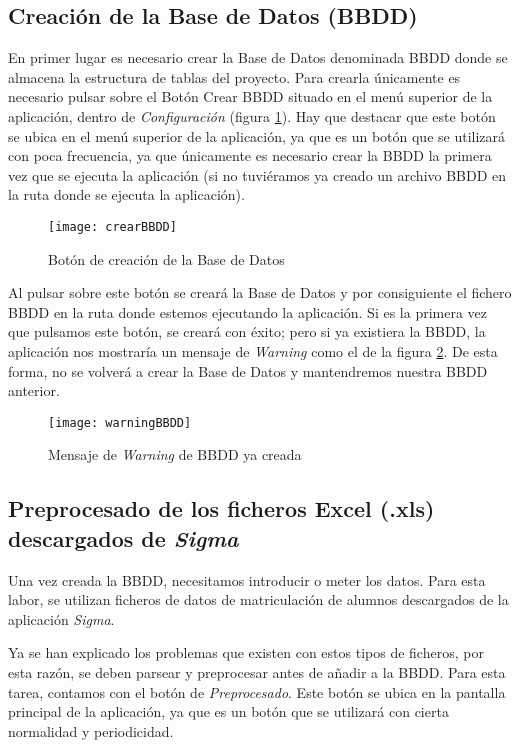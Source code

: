 \subsection{Creación de la Base de Datos (BBDD)}

En primer lugar es necesario crear la Base de Datos denominada BBDD donde se almacena la estructura de tablas del proyecto.
Para crearla únicamente es necesario pulsar sobre el Botón {Crear BBDD} situado en el menú superior de la aplicación, dentro de \emph{Configuración} (figura \ref{fig:crearBBDD}). Hay que destacar que este botón se ubica en el menú superior de la aplicación, ya que es un botón que se utilizará con poca frecuencia, ya que únicamente es necesario crear la BBDD la primera vez que se ejecuta la aplicación (si no tuviéramos ya creado un archivo BBDD en la ruta donde se ejecuta la aplicación). 

\begin{figure}%
		\centering
		\texttt{[image: crearBBDD]}
		\caption{Botón de creación de la Base de Datos}\label{fig:crearBBDD}
	\end{figure}


Al pulsar sobre este botón se creará la Base de Datos y por consiguiente el fichero BBDD en la ruta donde estemos ejecutando la aplicación.
Si es la primera vez que pulsamos este botón, se creará con éxito; pero si ya existiera la BBDD, la aplicación nos mostraría un mensaje de \emph{Warning} como el de la figura \ref{fig:warningBBDD}. De esta forma, no se volverá a crear la Base de Datos y mantendremos nuestra BBDD anterior.

\begin{figure}%
		\centering
		\texttt{[image: warningBBDD]}
		\caption{Mensaje de \emph{Warning} de BBDD ya creada}\label{fig:warningBBDD}
	\end{figure}



\subsection{Preprocesado de los ficheros Excel (.xls) descargados de \emph{Sigma}}

Una vez creada la BBDD, necesitamos introducir o meter los datos. Para esta labor, se utilizan ficheros de datos de matriculación de alumnos descargados de la aplicación \emph{Sigma}.

Ya se han explicado los problemas que existen con estos tipos de ficheros, por esta razón, se deben parsear y preprocesar antes de añadir a la BBDD. Para esta tarea, contamos con el botón de \emph{Preprocesado}. Este botón se ubica en la pantalla principal de la aplicación, ya que es un botón que se utilizará con cierta normalidad y periodicidad. 

